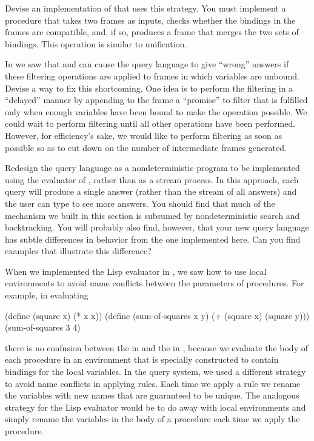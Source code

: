 \begin{exerciseGroup}
Devise an implementation of  that uses this strategy.  You must
implement a procedure that takes two frames as inputs, checks whether the
bindings in the frames are compatible, and, if so, produces a frame that merges
the two sets of bindings.  This operation is similar to unification.

\label{Exercise 4.77}
 In  we saw
that  and  can cause the query language to give
``wrong'' answers if these filtering operations are applied to frames in which
variables are unbound.  Devise a way to fix this shortcoming.  One idea is to
perform the filtering in a ``delayed'' manner by appending to the frame a
``promise'' to filter that is fulfilled only when enough variables have been
bound to make the operation possible.  We could wait to perform filtering until
all other operations have been performed.  However, for efficiency's sake, we
would like to perform filtering as soon as possible so as to cut down on the
number of intermediate frames generated.

\label{Exercise 4.78}
 Redesign the query language as a
nondeterministic program to be implemented using the evaluator of
, rather than as a stream process.  In this approach, each query will
produce a single answer (rather than the stream of all answers) and the user
can type  to see more answers.  You should find that much of
the mechanism we built in this section is subsumed by nondeterministic search
and backtracking.  You will probably also find, however, that your new query
language has subtle differences in behavior from the one implemented here.  Can
you find examples that illustrate this difference?

\label{Exercise 4.79}
 When we implemented the Lisp
evaluator in , we saw how to use local environments to avoid
name conflicts between the parameters of procedures.  For example, in
evaluating

\begin{codeBlock}
(define (square x) (* x x))
(define (sum-of-squares x y)
  (+ (square x) (square y)))
(sum-of-squares 3 4)
\end{codeBlock}

\noindent
there is no confusion between the  in  and the  in
, because we evaluate the body of each procedure in an
environment that is specially constructed to contain bindings for the local
variables.  In the query system, we used a different strategy to avoid name
conflicts in applying rules.  Each time we apply a rule we rename the variables
with new names that are guaranteed to be unique.  The analogous strategy for
the Lisp evaluator would be to do away with local environments and simply
rename the variables in the body of a procedure each time we apply the
procedure.


\end{exerciseGroup}
